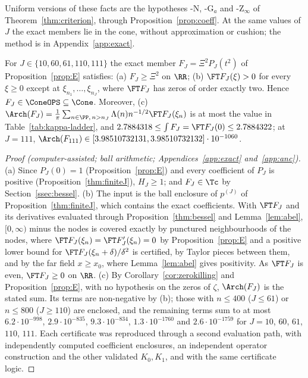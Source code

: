 Uniform versions of these facts are the hypotheses \hyp{N}, \hyp{G$_a$} and \hyp{Z$_\infty$} of Theorem~\ref{thm:criterion}, through
Proposition~\ref{prop:coeff}. At the same values of $J$ the exact members lie in the cone, without approximation or cushion; the method is in
Appendix~\ref{app:exact}.

\begin{proposition}\label{prop:exactcone}
For $J\in\{10,60,61,110,111\}$ the exact member $F_J=\Xi^2P_J(t^2)$ of Proposition~\ref{prop:E} satisfies:
\textup{(a)} $F_J\ge\Xi^2$ on $\RR$;
\textup{(b)} $\FT F_J(\xi)>0$ for every $\xi\ge0$ except at $\xi_{n_1},\dots,\xi_{n_J}$, where $\FT F_J$ has zeros of order exactly two.
Hence $F_J\in\ConeOPS\subseteq\Cone$. Moreover, \textup{(c)} $\Arch(F_J)=\frac1\pi\sum_{n\in\PP,\,n>n_J}\Lambda(n)n^{-1/2}\FT F_J(\xi_n)$ is at
most the value in Table~\ref{tab:kappa-ladder}, and $2.7884318\le\int F_J=\FT F_J(0)\le2.7884322$; at $J=111$,
$\Arch(F_{111})\in[3.98510732131,3.98510732132]\cdot10^{-1060}$.
\end{proposition}

\begin{proof}[Proof (computer-assisted; ball arithmetic; Appendices~\ref{app:exact} and~\ref{app:anc})]
(a) Since $P_J(0)=1$ (Proposition~\ref{prop:E}) and every coefficient of $P_J$ is positive (Proposition~\ref{thm:finiteJ}), $H_J\ge1$; and $F_J\in\Tc$ by
Section~\ref{ssec:bessel}. (b) The input is the ball
enclosure of $p^{(J)}$ of Proposition~\ref{thm:finiteJ}, which contains the exact coefficients. With $\FT F_J$ and its derivatives evaluated
through Proposition~\ref{thm:bessel} and Lemma~\ref{lem:abel}, $[0,\infty)$ minus the nodes is covered exactly by punctured neighbourhoods of the nodes, where
$\FT F_J(\xi_n)=\FT F_J'(\xi_n)=0$ by Proposition~\ref{prop:E} and a positive lower bound for $\FT F_J(\xi_n+\delta)/\delta^2$ is certified,
by Taylor pieces between them, and by the far field $x\ge x_0$, where Lemma~\ref{lem:abel} gives positivity. As $\FT F_J$ is even,
$\FT F_J\ge0$ on $\RR$. (c) By Corollary~\ref{cor:zerokilling} and Proposition~\ref{prop:E}, with no hypothesis on the zeros of $\zeta$,
$\Arch(F_J)$ is the stated sum. Its terms are non-negative by (b); those with $n\le400$ ($J\le61$) or $n\le800$ ($J\ge110$) are enclosed,
and the remaining terms sum to at most $6.2\cdot10^{-998}$, $2.9\cdot10^{-835}$, $9.3\cdot10^{-834}$, $1.3\cdot10^{-1760}$ and
$2.6\cdot10^{-1759}$ for $J=10$, $60$, $61$, $110$, $111$. Each certificate was reproduced through a second evaluation path, with
independently computed coefficient enclosures, an independent operator construction and the other validated $K_0,K_1$, and with the same
certificate logic.
\end{proof}

